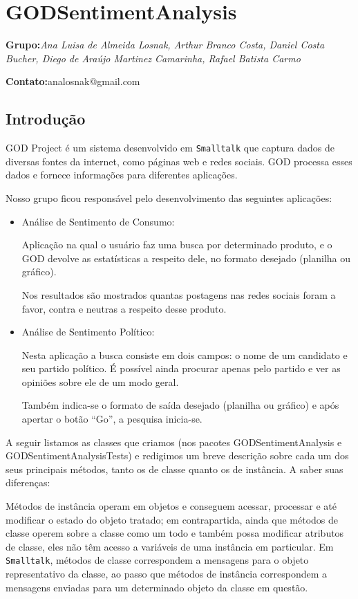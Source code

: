 \section{GODSentimentAnalysis}

\textbf{Grupo:}\textit{Ana Luisa de Almeida Losnak, Arthur Branco Costa, Daniel Costa Bucher, Diego de Araújo Martinez Camarinha, Rafael Batista Carmo}

\textbf{Contato:}analosnak@gmail.com


\subsection{Introdução}
GOD Project é um sistema desenvolvido em \texttt{Smalltalk} que captura dados de diversas fontes da internet, como páginas web e redes sociais. GOD processa esses dados e fornece informações para diferentes aplicações.

Nosso grupo ficou responsável pelo desenvolvimento das seguintes aplicações:

\begin{itemize}
	\item Análise de Sentimento de Consumo:
	
	Aplicação na qual o usuário faz uma busca por determinado produto, e o GOD devolve as estatísticas a respeito dele, no formato desejado (planilha ou gráfico).
	
	Nos resultados são mostrados quantas postagens nas redes sociais foram a favor, contra e neutras a respeito desse produto.
	
	\item Análise de Sentimento Político:
	
	Nesta aplicação a busca consiste em dois campos: o nome de um candidato e seu partido político. É possível ainda procurar apenas pelo partido e ver as opiniões sobre ele de um modo geral.

	Também indica-se o formato de saída desejado (planilha ou gráfico) e após apertar o botão ``Go'', a pesquisa inicia-se.
\end{itemize}


A seguir listamos as classes que criamos (nos pacotes GODSentimentAnalysis e GODSentimentAnalysisTests) e redigimos um breve descrição sobre cada um dos seus principais métodos, tanto os de classe quanto os de instância. A saber suas diferenças:

Métodos de instância operam em objetos e conseguem acessar, processar e até modificar o estado do objeto tratado; em contrapartida, ainda que métodos de classe operem sobre a classe como um todo e também possa modificar atributos de classe, eles não têm acesso a variáveis de uma instância em particular. Em \texttt{Smalltalk}, métodos de classe correspondem a mensagens para o objeto representativo da classe, ao passo que métodos de instância correspondem a mensagens enviadas para um determinado objeto da classe em questão.

